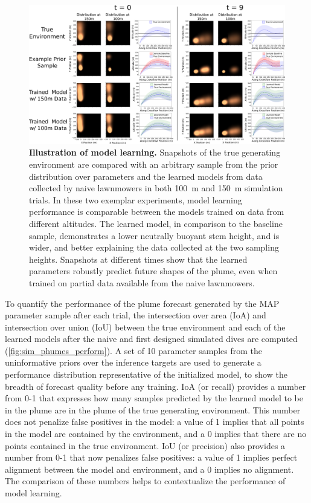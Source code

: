 \begin{figure}[h!]
    \centering
    \includegraphics[width=\columnwidth]{figures/sim_mod.png}
    \caption[Illustration of model learning]{\textbf{Illustration of model learning.} Snapshots of the true generating environment are compared with an arbitrary sample from the prior distribution over \PHUMES parameters and the learned models from data collected by naive lawnmowers in both \SI{100}{\meter} and \SI{150}{\meter} simulation trials. In these two exemplar experiments, model learning performance is comparable between the \PHUMES models trained on data from different altitudes. The learned model, in comparison to the baseline sample, demonstrates a lower neutrally buoyant stem height, and is wider, and better explaining the data collected at the two sampling heights. Snapshots at different times show that the learned parameters robustly predict future shapes of the plume, even when trained on partial data available from the naive lawnmowers.}
    \label{fig:sim_model}
\end{figure}

To quantify the performance of the plume forecast generated by the MAP parameter sample after each trial, the intersection over area (IoA) and intersection over union (IoU) between the true environment and each of the learned models after the naive and first \PHORTEX designed simulated dives are computed (\cref{fig:sim_phumes_perform}). A set of 10 parameter samples from the uninformative priors over the inference targets are used to generate a performance distribution representative of the initialized model, to show the breadth of forecast quality before any training. IoA (or recall) provides a number from 0-1 that expresses how many samples predicted by the learned model to be in the plume are in the plume of the true generating environment. This number does not penalize false positives in the model: a value of 1 implies that all points in the model are contained by the environment, and a 0 implies that there are no points contained in the true environment. IoU (or precision) also provides a number from 0-1 that now penalizes false positives: a value of 1 implies perfect alignment between the model and environment, and a 0 implies no alignment. The comparison of these numbers helps to contextualize the performance of model learning. 

